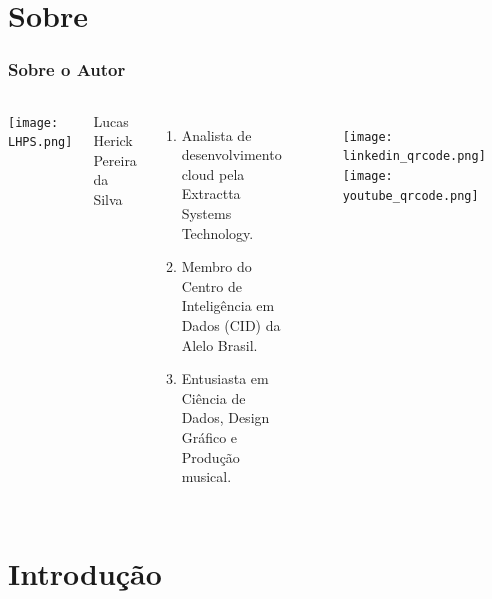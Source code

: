 \documentclass[aspectratio=43,8pt]{beamer}%
\begin{document}
	

\begin{frame}
	
\end{frame}	

\section{Sobre}

\begin{frame}
	\frametitle{Sobre o Autor}
	
	\begin{columns}
		
				
		\begin{center}
				\texttt{[image: LHPS.png]}
		\end{center}
			
%		
	Lucas Herick Pereira da Silva
	
	\vspace{5mm}
	
		\begin{enumerate}
		\item Analista de desenvolvimento cloud pela Extractta Systems  Technology.
		\item Membro do Centro de Inteligência em Dados (CID) da Alelo Brasil.
		\item Entusiasta em Ciência de Dados, Design Gráfico e Produção musical.
		\end{enumerate}
	
	\begin{figure}
		\centering
		\texttt{[image: linkedin\_qrcode.png]}
		\texttt{[image: youtube\_qrcode.png]}
	\end{figure}
	
	\end{columns}
\end{frame}


\section{Introdução}
\end{document}
